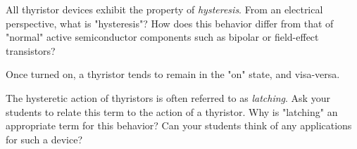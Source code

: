 

All thyristor devices exhibit the property of {\it hysteresis}.  From an electrical perspective, what is "hysteresis"?  How does this behavior differ from that of "normal" active semiconductor components such as bipolar or field-effect transistors?







Once turned on, a thyristor tends to remain in the "on" state, and visa-versa.







The hysteretic action of thyristors is often referred to as {\it latching}.  Ask your students to relate this term to the action of a thyristor.  Why is "latching" an appropriate term for this behavior?  Can your students think of any applications for such a device?





